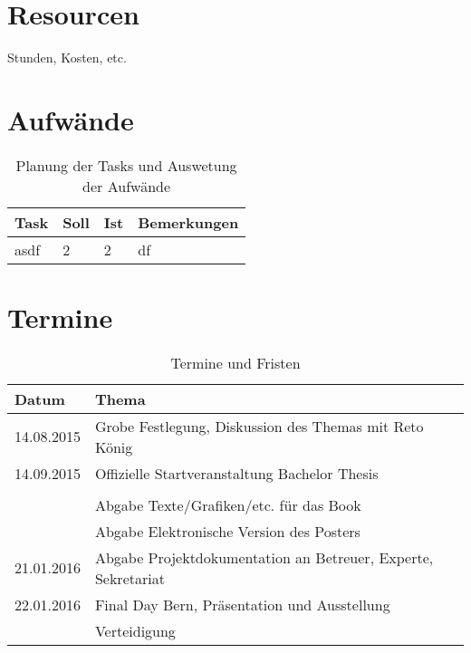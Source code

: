 \section{Resourcen}
Stunden, Kosten, etc.



\section{Aufwände}

\begin{table}[h!]
\begin{tabularx}{\textwidth}{|l|l|l|X|}

 \hline
 {\bf Task } & {\bf Soll } & {\bf Ist }  & {\bf Bemerkungen } \\ 
 \hline
 asdf    &   2   &  2     & df  \\
 \hline

\end{tabularx}
\caption{Planung der Tasks und Auswetung der Aufwände}
\end{table}


\section{Termine}
\begin{table}[h!]
\begin{tabularx}{\textwidth}{|l|X|}

 \hline
 {\bf Datum } & {\bf Thema } \\ 
 \hline
 14.08.2015   & Grobe Festlegung, Diskussion des Themas mit Reto König  \\ \hline
 14.09.2015   & Offizielle Startveranstaltung Bachelor Thesis  \\ \hline
  & \\ \hline
              & Abgabe Texte/Grafiken/etc. für das Book  \\ \hline
              & Abgabe Elektronische Version des Posters  \\ \hline
 21.01.2016   & Abgabe Projektdokumentation an Betreuer, Experte, Sekretariat  \\ \hline
 22.01.2016   & Final Day Bern, Präsentation und Ausstellung  \\ \hline
              & Verteidigung \\ \hline

\end{tabularx}
\caption{Termine und Fristen}
\end{table}